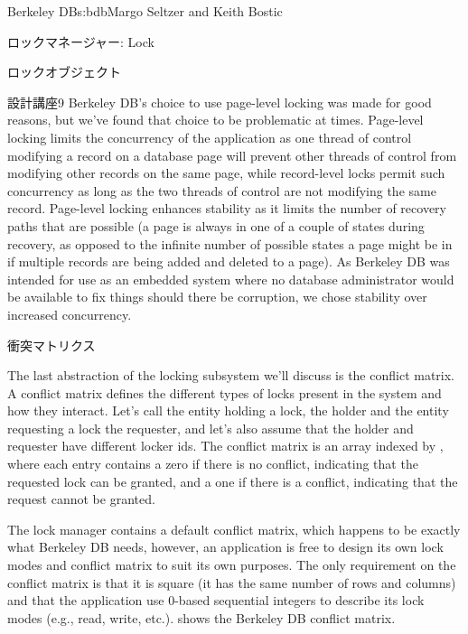 \begin{aosachapter}{Berkeley DB}{s:bdb}{Margo Seltzer and Keith Bostic}
\begin{aosasect1}{ロックマネージャー: Lock}
\begin{aosasect2}{ロックオブジェクト}
\begin{aosabox}{設計講座9}
Berkeley DB's choice to use page-level locking was made for good
reasons, but we've found that choice to be problematic at times. Page-level locking
limits the concurrency of the application as one thread of control
modifying a record on a database page will prevent other threads of
control from modifying other records on the same page, while
record-level locks permit such concurrency as long as the two threads
of control are not modifying the same record.  Page-level locking
enhances stability as it limits the number of recovery paths that are
possible (a page is always in one of a couple of states during
recovery, as opposed to the infinite number of possible states a page
might be in if multiple records are being added and deleted to a
page). As Berkeley DB was intended for use as an embedded system where
no database administrator would be available to fix things should
there be corruption, we chose stability over increased concurrency.

\end{aosabox}

\end{aosasect2}

\begin{aosasect2}{衝突マトリクス}

The last abstraction of the locking subsystem we'll discuss is the
conflict matrix. A conflict matrix defines the different types of
locks present in the system and how they interact. Let's call the
entity holding a lock, the holder and the entity requesting a lock the
requester, and let's also assume that the holder and requester have
different locker ids.  The conflict matrix is an array indexed by
\code{[requester][holder]}, where each entry contains a zero if there
is no conflict, indicating that the requested lock can be granted, and
a one if there is a conflict, indicating that the request cannot be
granted.

The lock manager contains a default conflict matrix, which happens to
be exactly what Berkeley DB needs, however, an application is free to
design its own lock modes and conflict matrix to suit its own
purposes.  The only requirement on the conflict matrix is that it is
square (it has the same number of rows and columns) and that the
application use 0-based sequential integers to describe its lock
modes (e.g., read, write, etc.).   
 shows the Berkeley DB conflict matrix.


\end{aosasect2}
\end{aosasect1}
\end{aosachapter}
